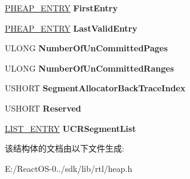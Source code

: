 \begin{DoxyCompactItemize}
\mbox{\label{struct___h_e_a_p___s_e_g_m_e_n_t_adac5e9c7df8e724dc1a95f5b03edf746}} 
\hyperlink{struct___h_e_a_p___e_n_t_r_y}{P\+H\+E\+A\+P\+\_\+\+E\+N\+T\+RY} {\bfseries First\+Entry}
\item 
\mbox{\label{struct___h_e_a_p___s_e_g_m_e_n_t_ab24228c994569b0cb5a4e866f1b83d97}} 
\hyperlink{struct___h_e_a_p___e_n_t_r_y}{P\+H\+E\+A\+P\+\_\+\+E\+N\+T\+RY} {\bfseries Last\+Valid\+Entry}
\item 
\mbox{\label{struct___h_e_a_p___s_e_g_m_e_n_t_adb97658427efcd84239ec402f1930690}} 
U\+L\+O\+NG {\bfseries Number\+Of\+Un\+Committed\+Pages}
\item 
\mbox{\label{struct___h_e_a_p___s_e_g_m_e_n_t_abb104505e87c25b5b96910562622bb58}} 
U\+L\+O\+NG {\bfseries Number\+Of\+Un\+Committed\+Ranges}
\item 
\mbox{\label{struct___h_e_a_p___s_e_g_m_e_n_t_ae0fc28520d31007df12098e925e9557d}} 
U\+S\+H\+O\+RT {\bfseries Segment\+Allocator\+Back\+Trace\+Index}
\item 
\mbox{\label{struct___h_e_a_p___s_e_g_m_e_n_t_a626c63e3a560f29d6a0d9546dceaafc9}} 
U\+S\+H\+O\+RT {\bfseries Reserved}
\item 
\mbox{\label{struct___h_e_a_p___s_e_g_m_e_n_t_aa71ba1658a3bdb06d44ccfe1f6785d39}} 
\hyperlink{struct___l_i_s_t___e_n_t_r_y}{L\+I\+S\+T\+\_\+\+E\+N\+T\+RY} {\bfseries U\+C\+R\+Segment\+List}
\end{DoxyCompactItemize}


该结构体的文档由以下文件生成\+:\begin{DoxyCompactItemize}
\item 
E\+:/\+React\+O\+S-\/0../sdk/lib/rtl/heap.\+h\end{DoxyCompactItemize}
